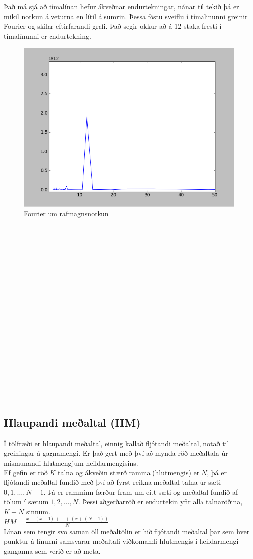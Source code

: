 \documentclass[11pt]{article}
\begin{document}
Það má sjá að tímalínan hefur ákveðnar endurtekningar, nánar til tekið þá er mikil notkun á veturna en lítil á sumrin.
Þessa föstu sveiflu í tímalinunni greinir Fourier og skilar eftirfarandi grafi. 
Það segir okkur að á 12 staka fresti í tímalínunni er endurtekning.

\begin{figure}
 \begin{center}
 \includegraphics[width=.45\textwidth]{Fourier.png}
 \caption{Fourier um rafmagnsnotkun}
  \end{center}
\end{figure}
\hfill
\\\\\\\\\\\\\\\\\\\\\\\\\\\\\\\\\\\

\subsection{Hlaupandi meðaltal (HM)}
Í tölfræði er hlaupandi meðaltal, einnig kallað fljótandi meðaltal, notað til greiningar á gagnamengi. 
Er það gert með því að mynda röð meðaltala úr mismunandi hlutmengjum heildarmengisins.\\
Ef gefin er röð $K$ talna og ákveðin stærð ramma (hlutmengis) er $N$, þá er fljótandi meðaltal fundið með því að fyrst reikna meðaltal 
talna úr sæti $0,1,\dots,N-1$. Þá er ramminn færður fram um eitt sæti og meðaltal fundið af tölum í sætum $1,2,\dots,N$. 
Þessi aðgerðarröð er endurtekin yfir alla talnaröðina, $K-N$ sinnum.  \\
$HM = \frac{x+(x+1)+\dots+(x+(N-1))}{N}$
\\
Línan sem tengir svo saman öll meðaltölin er hið fljótandi meðaltal þar sem hver punktur á línunni samsvarar 
meðaltali viðkomandi hlutmengis í heildarmengi ganganna sem verið er að meta. 
 
\end{document}
